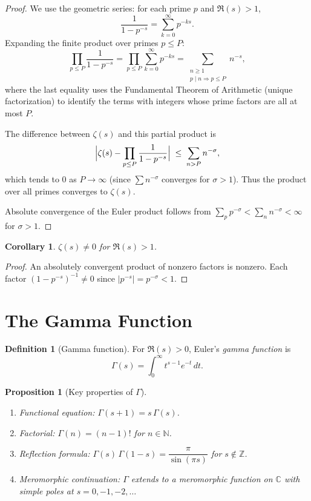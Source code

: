 \documentclass[12pt,a4paper]{amsart}
\newtheorem{corollary}[theorem]{Corollary}
\newtheorem{proposition}[theorem]{Proposition}
\theoremstyle{definition}
\newtheorem{definition}[theorem]{Definition}
\newcommand{\N}{\mathbb{N}}
\newcommand{\Z}{\mathbb{Z}}
\newcommand{\C}{\mathbb{C}}
\begin{document}
\begin{proof}
We use the geometric series: for each prime $p$ and $\Re(s) > 1$,
\[
  \frac{1}{1 - p^{-s}} = \sum_{k=0}^{\infty} p^{-ks}.
\]
Expanding the finite product over primes $p \le P$:
\[
  \prod_{p \le P} \frac{1}{1 - p^{-s}}
  = \prod_{p \le P} \sum_{k=0}^{\infty} p^{-ks}
  = \sum_{\substack{n \ge 1 \\ p \mid n \Rightarrow p \le P}} n^{-s},
\]
where the last equality uses the Fundamental Theorem of Arithmetic
(unique factorization) to identify the terms with integers whose prime
factors are all at most $P$.

The difference between $\zeta(s)$ and this partial product is
\[
  \Bigl|\zeta(s) - \prod_{p \le P}\frac{1}{1-p^{-s}}\Bigr|
  \;\le\; \sum_{n > P} n^{-\sigma},
\]
which tends to $0$ as $P \to \infty$ (since $\sum n^{-\sigma}$ converges
for $\sigma > 1$).  Thus the product over all primes converges to $\zeta(s)$.

Absolute convergence of the Euler product follows from
$\sum_p p^{-\sigma} < \sum_n n^{-\sigma} < \infty$ for $\sigma > 1$.
\end{proof}

\begin{corollary}
$\zeta(s) \ne 0$ for $\Re(s) > 1$.
\end{corollary}

\begin{proof}
An absolutely convergent product of nonzero factors is nonzero.
Each factor $(1 - p^{-s})^{-1} \ne 0$ since $|p^{-s}| = p^{-\sigma} < 1$.
\end{proof}

\section{The Gamma Function}
\label{sec:gamma}

\begin{definition}[Gamma function]
\label{def:gamma}
For $\Re(s) > 0$, Euler's \emph{gamma function} is
\[
  \Gamma(s) = \int_0^{\infty} t^{s-1} e^{-t}\,dt.
\]
\end{definition}

\begin{proposition}[Key properties of $\Gamma$]
\label{prop:gamma_props}
\begin{enumerate}
  \item[\textup{(i)}] \textit{Functional equation:} $\Gamma(s+1) = s\,\Gamma(s)$.
  \item[\textup{(ii)}] \textit{Factorial:} $\Gamma(n) = (n-1)!$ for $n \in \N$.
  \item[\textup{(iii)}] \textit{Reflection formula:}
    $\Gamma(s)\,\Gamma(1-s) = \dfrac{\pi}{\sin(\pi s)}$ for $s \notin \Z$.
  \item[\textup{(iv)}] \textit{Meromorphic continuation:} $\Gamma$ extends to a
    meromorphic function on $\C$ with simple poles at $s = 0, -1, -2, \ldots$
\end{enumerate}
\end{proposition}
\end{document}
